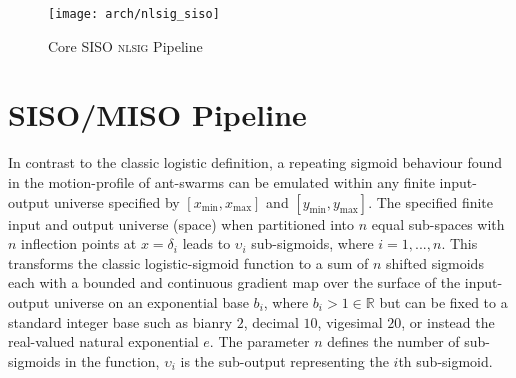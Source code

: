 \documentclass[journal]{IEEEtran}
\theoremstyle{plain}
\theoremstyle{definition}
\theoremstyle{remark}
\begin{document}
\begin{figure}[]
	\centering
	\texttt{[image: arch/nlsig\_siso]}
	\caption[Core \textsc{nlsig} Pipeline]{Core SISO \textsc{nlsig} Pipeline}
	\label{fig:nlsigsiso}
\end{figure}

\section{SISO/MISO Pipeline}\label{sec_sisodef}
In contrast to the classic logistic definition, a repeating sigmoid behaviour found in the motion-profile of ant-swarms can be emulated within any finite input-output universe specified by $[x_{\min}, x_{\max}]$ and $[y_{\min}, y_{\max}]$. The specified finite input and output universe (space) when partitioned into $n$ equal sub-spaces with $n$ inflection points at $x=\delta_i$ leads to $\upsilon_i$ sub-sigmoids, where $i=1,...,n$. This transforms the classic logistic-sigmoid function to a sum of $n$ shifted sigmoids each with a bounded and continuous gradient map over the surface of the input-output universe on an exponential base $b_i$, where $b_i>1 \in \mathbb{R}$ but can be fixed to a standard integer base such as bianry $2$, decimal $10$, vigesimal $20$, or instead the real-valued natural exponential $e$. The parameter $n$ defines the number of sub-sigmoids in the function, $\upsilon_i$ is the sub-output representing the $i$th sub-sigmoid.
\end{document}
